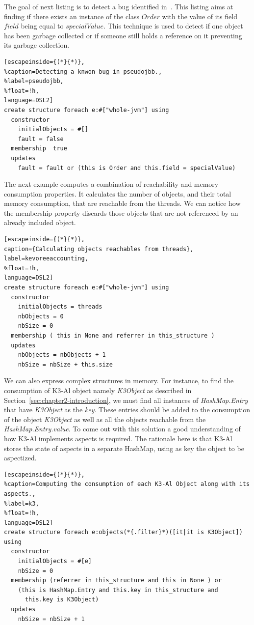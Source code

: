 The goal of next listing is to detect a bug identified in~\cite{Aftandilian:2009:GAU:1543135.1542503}.
This listing aims at finding if there exists an instance of the class $Order$
with the value of its field $field$ being equal to $specialValue$.
This technique is used to detect if one object has been garbage collected or if someone still holds a reference on it preventing its garbage collection.

\begin{lstlisting}[escapeinside={(*}{*)},
%caption=Detecting a knwon bug in pseudojbb., 
%label=pseudojbb,
%float=!h,
language=DSL2]
create structure foreach e:#["whole-jvm"] using
  constructor
	initialObjects = #[]
	fault = false
  membership  true
  updates
    fault = fault or (this is Order and this.field = specialValue)
\end{lstlisting}

The next example computes a combination of reachability and memory consumption properties.
It calculates the number of objects, and their total memory consumption, that are reachable from the threads.
We can notice how the membership property discards those objects that are not referenced by an already included object.  

\begin{lstlisting}[escapeinside={(*}{*)},
caption={Calculating objects reachables from threads},
label=kevoreeaccounting,
%float=!h,
language=DSL2]
create structure foreach e:#["whole-jvm"] using
  constructor
    initialObjects = threads
    nbObjects = 0 
    nbSize = 0 
  membership ( this in None and referrer in this_structure )
  updates 
    nbObjects = nbObjects + 1  
    nbSize = nbSize + this.size
\end{lstlisting}

We can also express complex structures in memory.
For instance, to find the consumption of K3-Al object namely \textit{K3Object} as described in Section~\ref{sec:chapter2-introduction}, we must find all instances of \textit{HashMap.Entry} that have \textit{K3Object} as the \textit{key}. These entries should be added to the consumption of the object \textit{K3Object} as well as all the objects reachable from the \textit{HashMap.Entry.value}.
To come out with this solution a good understanding of how K3-Al implements aspects is required.
The rationale here is that K3-Al stores the state of aspects in a separate HashMap, using as key the object to be aspectized.

\begin{lstlisting}[escapeinside={(*}{*)},
%caption=Computing the consumption of each K3-Al Object along with its aspects., 
%label=k3,
%float=!h, 
language=DSL2]
create structure foreach e:objects(*{.filter}*)([it|it is K3Object]) using
  constructor
    initialObjects = #[e]
    nbSize = 0
  membership (referrer in this_structure and this in None ) or
    (this is HashMap.Entry and this.key in this_structure and 
      this.key is K3Object)
  updates
    nbSize = nbSize + 1
\end{lstlisting}